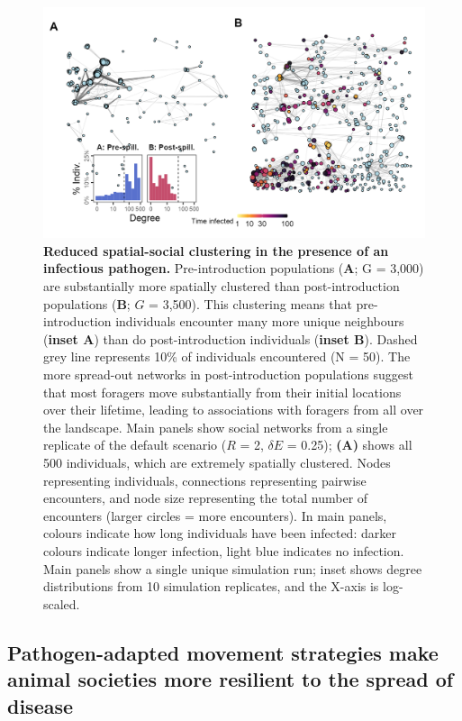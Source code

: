 \begin{figure}[!h]
    \centering
    \includegraphics[width=0.9\linewidth]{figures/pathomove/fig_03.png}
    \caption{
        \textbf{Reduced spatial-social clustering in the presence of an infectious pathogen.}
        Pre-introduction populations (\textbf{A}; G = 3,000) are substantially more spatially clustered than post-introduction populations (\textbf{B}; $G$ = 3,500).
        This clustering means that pre-introduction individuals encounter many more unique neighbours (\textbf{inset A}) than do post-introduction individuals (\textbf{inset B}).
        Dashed grey line represents 10\% of individuals encountered (N = 50).
        The more spread-out networks in post-introduction populations suggest that most foragers move substantially from their initial locations over their lifetime, leading to associations with foragers from all over the landscape.
        Main panels show social networks from a single replicate of the default scenario ($R$ = 2, $\delta E$ = 0.25); \textbf{(A)} shows all 500 individuals, which are extremely spatially clustered.
        Nodes representing individuals, connections representing pairwise encounters, and node size representing the total number of encounters (larger circles = more encounters).
        In main panels, colours indicate how long individuals have been infected: darker colours indicate longer infection, light blue indicates no infection.
        Main panels show a single unique simulation run; inset shows degree distributions from 10 simulation replicates, and the X-axis is log-scaled.
    }\label{fig3}
\end{figure}

\subsection*{Pathogen-adapted movement strategies make animal societies more resilient to the spread of disease}


